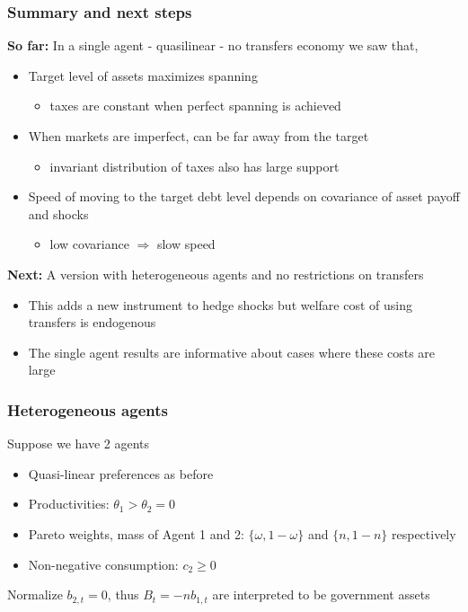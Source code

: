 \documentclass{beamer}
\begin{document}
\smallskip 
\begin{frame}%

\frametitle{Summary and next steps}

\smallskip

\textbf{So far:} In a single agent - quasilinear - no transfers economy we saw that,

\begin{itemize}
\item Target level of assets maximizes spanning
\begin{itemize}
\item taxes are constant when perfect spanning is achieved
\end{itemize}
\item When markets are imperfect, can be far away from the target
\begin{itemize}
\item invariant distribution of taxes also has large support
\end{itemize}
\item Speed of moving to the target debt level depends on covariance of
asset payoff and shocks

\begin{itemize}
\item low covariance $\Longrightarrow $ slow speed
\end{itemize}
\end{itemize}

\textbf{Next:} A version with heterogeneous agents and no restrictions on transfers
\begin{itemize}
\item This adds a new instrument to hedge shocks but welfare cost of using transfers is endogenous
\item The single agent results are informative about cases where these costs are large
\end{itemize}


\end{frame}%

\begin{frame}
\frametitle{Heterogeneous agents}
Suppose we have 2 agents

\begin{itemize}
\item Quasi-linear preferences as before
\item Productivities: $\theta_1>\theta _{2}=0$ 
\item Pareto weights, mass of Agent 1 and 2: $\{\omega,1-\omega\}$ and $\{n,1-n\}$ respectively
\item Non-negative consumption: $c_{2}\geq 0$
\end{itemize}

Normalize $b_{2,t}=0$, thus $B_t=-nb_{1,t}$ are interpreted to be government assets
\end{frame}
\end{document}
